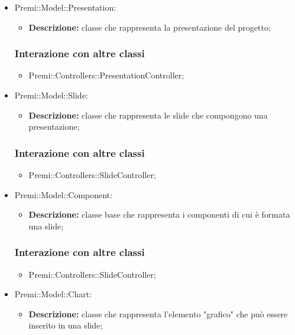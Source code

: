 \begin{itemize}
		\item Premi::Model::Presentation:
		\begin{itemize}
			\item \textbf{Descrizione:} classe che rappresenta la presentazione del progetto;
		\end{itemize}
		\subsubsection*{Interazione con altre classi}
		\begin{itemize}
			\item Premi::Controllers::PresentationController;
		\end{itemize}
		
		\item Premi::Model::Slide:
		\begin{itemize}
			\item \textbf{Descrizione:} classe che rappresenta le \gls{slide} che compongono una presentazione;
		\end{itemize}
		\subsubsection*{Interazione con altre classi}
		\begin{itemize}
			\item Premi::Controllers::SlideController;
		\end{itemize}
		
		\item Premi::Model::Component:
		\begin{itemize}
			\item \textbf{Descrizione:} classe base che rappresenta i componenti di cui è formata una \gls{slide};
		\end{itemize}
		\subsubsection*{Interazione con altre classi}
		\begin{itemize}
			\item Premi::Controllers::SlideController;
		\end{itemize}
		
		\item Premi::Model::Chart:
		\begin{itemize}
			\item \textbf{Descrizione:} classe che rappresenta l'elemento "grafico" che può essere inserito in una \gls{slide};
		\end{itemize}

\end{itemize}
